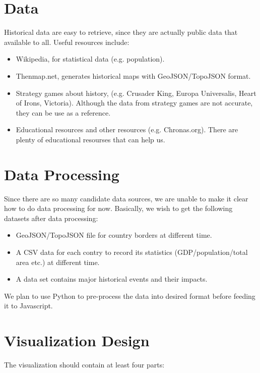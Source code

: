 \documentclass[12pt, fullpage,letterpaper]{article}
\begin{document}
\section{Data}
Historical data are easy to retrieve, since they are actually public data that available to all.
Useful resources include:

\begin{itemize}
    \item Wikipedia, for statistical data (e.g. population).
    \item Thenmap.net, generates historical maps with GeoJSON/TopoJSON format.
    \item Strategy games about history, (e.g. Crusader King, Europa Universalis, Heart of Irons, Victoria). Although the data from strategy games are not accurate, they can be use
        as a reference.
    \item Educational resources and other resources (e.g. Chronas.org). There are plenty of educational resourses that can help us.
\end{itemize}

\section{Data Processing}
Since there are so many candidate data sources, we are unable to make it clear how to do data processing for now.
Basically, we wish to get the following datasets after data processing:
\begin{itemize}
    \item GeoJSON/TopoJSON file for country borders at different time.
    \item A CSV data for each contry to record its statistics (GDP/population/total area etc.) at different time.
    \item A data set contains major historical events and their impacts.
\end{itemize}

We plan to use Python to pre-process the data into desired format before feeding it to Javascript.

\section{Visualization Design}

The visualization should contain at least four parts:
\end{document}
